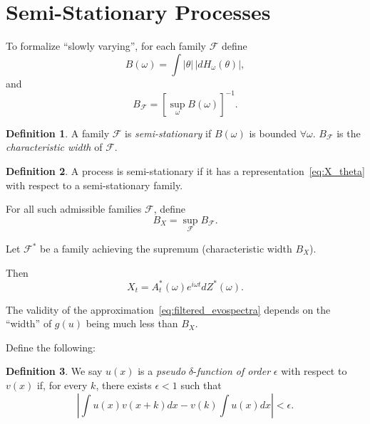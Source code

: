 \documentclass[12pt]{article}
\theoremstyle{definition}
\newtheorem{definition}{Definition}[section]
\theoremstyle{plain}
\theoremstyle{remark}
\begin{document}
\section{Semi-Stationary Processes}

To formalize ``slowly varying'', for each family $\mathcal{F}$ define
\begin{equation}
B(\omega) = \int |\theta|\, |dH_\omega(\theta)|,
\label{eq:Bw}
\end{equation}
and
\begin{equation}
B_\mathcal{F} = [\sup_\omega B(\omega)]^{-1}.
\label{eq:B_F}
\end{equation}

\begin{definition}
\label{def:semi_stationary_family}
A family $\mathcal{F}$ is \emph{semi-stationary} if $B(\omega)$ is bounded $\forall \omega$. $B_\mathcal{F}$ is the \emph{characteristic width} of $\mathcal{F}$.
\end{definition}

\begin{definition}
\label{def:semi_stationary_process}
A process is semi-stationary if it has a representation~\eqref{eq:X_theta} with respect to a semi-stationary family.
\end{definition}

For all such admissible families $\mathcal{F}$, define
\begin{equation}
B_X = \sup_{\mathcal{F}} B_\mathcal{F}.
\label{eq:BX}
\end{equation}

Let $\mathcal{F}^*$ be a family achieving the supremum (characteristic width $B_X$).

Then
\begin{equation}
X_t = A^*_t(\omega) e^{i\omega t} dZ^*(\omega).
\label{eq:X_Fstar}
\end{equation}

The validity of the approximation~\eqref{eq:filtered_evospectra} depends on the ``width'' of $g(u)$ being much less than $B_X$.

Define the following:

\begin{definition}
We say $u(x)$ is a \emph{pseudo} $\delta$-\emph{function of order} $\epsilon$ with respect to $v(x)$ if, for every $k$, there exists $\epsilon<1$ such that
\begin{equation}
\left|\int u(x) v(x+k) dx - v(k) \int u(x) dx \right| < \epsilon.
\end{equation}
\end{definition}
\end{document}

